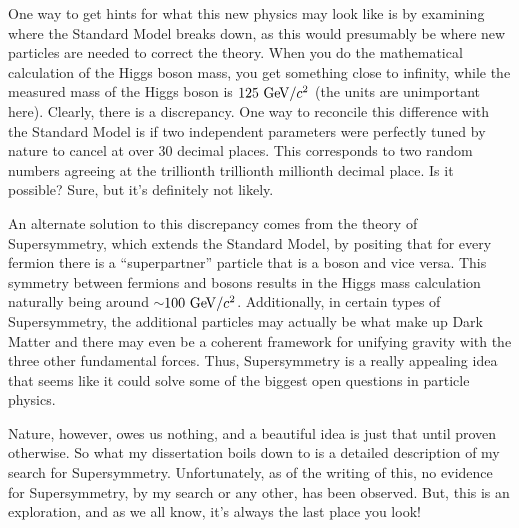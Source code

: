 One way to get hints for what this new physics may look like is by examining where the Standard Model breaks down, as this would presumably be where new particles are needed to correct the theory.
When you do the mathematical calculation of the Higgs boson mass, you get something close to infinity, while the measured mass of the Higgs boson is $125~\mathrm{Ge\kern -0.1em V}/c^2$ (the units are unimportant here).
Clearly, there is a discrepancy.
One way to reconcile this difference with the Standard Model is if two independent parameters were perfectly tuned by nature to cancel at over 30 decimal places.
This corresponds to two random numbers agreeing at the trillionth trillionth millionth decimal place.
Is it possible? 
Sure, but it's definitely not likely.

An alternate solution to this discrepancy comes from the theory of Supersymmetry, which extends the Standard Model, by positing that for every fermion there is a ``superpartner'' particle that is a boson and vice versa.
This symmetry between fermions and bosons results in the Higgs mass calculation naturally being around $\sim$$100~\mathrm{Ge\kern -0.1em V}/c^2$.
Additionally, in certain types of Supersymmetry, the additional particles may actually be what make up Dark Matter and there may even be a coherent framework for unifying gravity with the three other fundamental forces.
Thus, Supersymmetry is a really appealing idea that seems like it could solve some of the biggest open questions in particle physics.

Nature, however, owes us nothing, and a beautiful idea is just that until proven otherwise.
So what my dissertation boils down to is a detailed description of my search for Supersymmetry.
Unfortunately, as of the writing of this, no evidence for Supersymmetry, by my search or any other, has been observed.
But, this is an exploration, and as we all know, it's always the last place you look!
